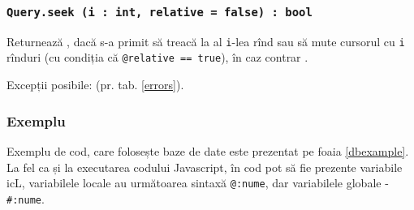 \subsubsection{\texttt{Query.seek (i : int, relative = false) : bool}}

Returnează \true, dacă s-a primit să treacă la al \texttt{i}-lea rînd sau să mute cursorul cu \texttt{i} rînduri (cu condiția că \texttt{@relative == true}), în caz contrar \false.

Excepții posibile:  (pr. tab. \ref{errors}).

\subsubsection{Exemplu}

Exemplu de cod, care folosește baze de date este prezentat pe foaia \ref{dbexample}. La fel ca și la executarea codului Javascript, în cod pot să fie prezente variabile icL, variabilele locale au următoarea sintaxă \texttt{@:nume}, dar variabilele globale - \texttt{#:nume}.

\newpage
\begin{sourcecode}
    \label{dbexample}
    \inputminted[linenos]{icl}{../sources/dbexample.icL}
\end{sourcecode}

